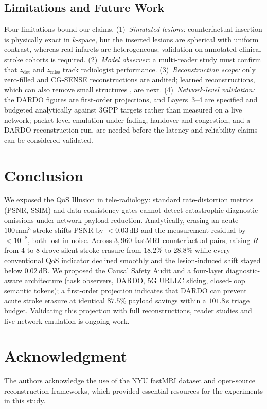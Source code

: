 \documentclass[conference]{IEEEtran}
\begin{document}
\subsection{Limitations and Future Work}
\label{sec:limitations}
Four limitations bound our claims. (1)~\emph{Simulated lesions:} counterfactual insertion is physically exact in $k$-space, but the inserted lesions are spherical with uniform contrast, whereas real infarcts are heterogeneous; validation on annotated clinical stroke cohorts is required. (2)~\emph{Model observer:} a multi-reader study must confirm that $z_{\text{det}}$ and $z_{\text{miss}}$ track radiologist performance. (3)~\emph{Reconstruction scope:} only zero-filled and CG-SENSE reconstructions are audited; learned reconstructions, which can also remove small structures \cite{antun2020instabilities,bhadra2021hallucinations}, are next. (4)~\emph{Network-level validation:} the DARDO figures are first-order projections, and Layers~3--4 are specified and budgeted analytically against 3GPP targets rather than measured on a live network; packet-level emulation under fading, handover and congestion, and a DARDO reconstruction run, are needed before the latency and reliability claims can be considered validated.

\section{Conclusion}
\label{sec:conclusion}

We exposed the QoS Illusion in tele-radiology: standard rate-distortion metrics (PSNR, SSIM) and data-consistency gates cannot detect catastrophic diagnostic omissions under network payload reduction. Analytically, erasing an acute $100\,\text{mm}^3$ stroke shifts PSNR by $<0.03\,\text{dB}$ and the measurement residual by $<10^{-8}$, both lost in noise. Across $3{,}960$ fastMRI counterfactual pairs, raising $R$ from $4$ to $8$ drove silent stroke erasure from $18.2\%$ to $28.8\%$ while every conventional QoS indicator declined smoothly and the lesion-induced shift stayed below $0.02\,$dB. We proposed the Causal Safety Audit and a four-layer diagnostic-aware architecture (task observers, DARDO, 5G URLLC slicing, closed-loop semantic tokens); a first-order projection indicates that DARDO can prevent acute stroke erasure at identical $87.5\%$ payload savings within a $101.8\,$s triage budget. Validating this projection with full reconstructions, reader studies and live-network emulation is ongoing work.

\section*{Acknowledgment}
The authors acknowledge the use of the NYU fastMRI dataset and open-source reconstruction frameworks, which provided essential resources for the experiments in this study.



\end{document}
